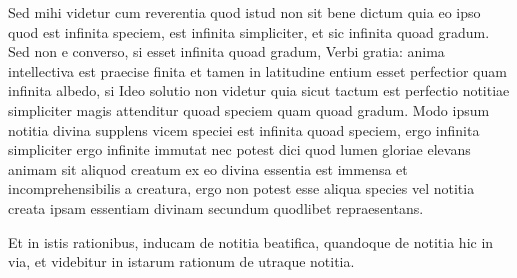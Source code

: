 \documentclass[twoside, openright]{report}
\begin{document}
        \pstart
        Sed mihi videtur cum  reverentia quod istud non sit  bene dictum  quia eo ipso quod est infinita   speciem, est infinita simpliciter, et sic infinita quoad gradum. Sed non  e converso, si esset infinita quoad gradum,  Verbi gratia: anima intellectiva est praecise finita et tamen in latitudine entium esset perfectior quam infinita albedo, si  Ideo solutio non videtur  quia sicut tactum est perfectio notitiae simpliciter magis attenditur quoad speciem quam quoad gradum. Modo  ipsum notitia divina supplens vicem speciei est infinita quoad speciem, ergo infinita simpliciter ergo infinite immutat nec potest dici quod lumen gloriae elevans animam sit aliquod creatum ex eo  divina essentia est immensa et incomprehensibilis a creatura, ergo non potest esse aliqua species vel notitia creata ipsam essentiam divinam secundum quodlibet  repraesentans.
        \pend
     
        \pstart
        Et in istis rationibus,  inducam de notitia beatifica, quandoque de notitia hic in via, et videbitur in  istarum rationum de utraque notitia.
        \pend
      
        \bigskip
\end{document}
